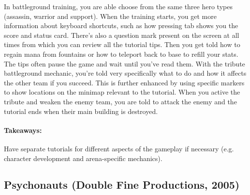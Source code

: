 In battleground training, you are able choose from the same three hero types (assassin, warrior and support).
When the training starts, you get more information about keyboard shortcuts, such as how pressing tab shows you the score and status card.
There's also a question mark present on the screen at all times from which you can review all the tutorial tips.
Then you get told how to regain mana from fountains or how to teleport back to base to refill your stats.
The tips often pause the game and wait until you've read them.
With the tribute battleground mechanic, you're told very specifically what to do and how it affects the other team if you succeed. This is further enhanced by using specific markers to show locations on the minimap relevant to the tutorial.
When you active the tribute and weaken the enemy team, you are told to attack the enemy and the tutorial ends when their main building is destroyed.
\paragraph{Takeaways:}
Have separate tutorials for different aspects of the gameplay if necessary (e.g. character development and arena-specific mechanics).

\subsection{Psychonauts (Double Fine Productions, 2005)}
